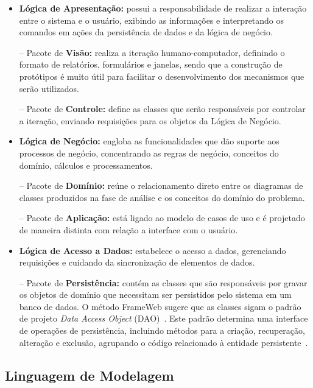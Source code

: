 \begin{itemize}

	\item \textbf{Lógica de Apresentação:} possui a responsabilidade de realizar a interação entre o sistema e o usuário, exibindo as informações e interpretando os comandos em ações da persistência de dados e da lógica de negócio.
		
		\subitem -- Pacote de \textbf{Visão:} realiza a iteração humano-computador, definindo o formato de relatórios, formulários e janelas, sendo que a construção de protótipos é muito útil para facilitar o desenvolvimento dos mecanismos que serão utilizados. 
		
		\subitem -- Pacote de \textbf{Controle:} define as classes que serão responsáveis por controlar a iteração, enviando requisições para os objetos da Lógica de Negócio.  
	
	\item \textbf{Lógica de Negócio:} engloba as funcionalidades que dão suporte aos processos de negócio, concentrando as regras de negócio, conceitos do domínio, cálculos e processamentos.
	
		\subitem -- Pacote de \textbf{Domínio:} reúne o relacionamento direto entre os diagramas de classes produzidos na fase de análise e os conceitos do domínio do problema. 
		
		\subitem -- Pacote de \textbf{Aplicação:} está ligado ao modelo de casos de uso e é projetado de maneira distinta com relação a interface com o usuário.
	
	\item \textbf{Lógica de Acesso a Dados:} estabelece o acesso a dados, gerenciando requisições e cuidando da sincronização de elementos de dados.
	
		\subitem -- Pacote de \textbf{Persistência:} contém as classes que são responsáveis por gravar os objetos de domínio que necessitam ser persistidos pelo sistema em um banco de dados. O método FrameWeb sugere que as classes sigam o padrão de projeto \textit{Data Access Object} (DAO)~\cite{alur-et-al:bpds03}. Este padrão determina uma interface de operações de persistência, incluindo métodos para a criação, recuperação, alteração e exclusão, agrupando o código relacionado à entidade persistente~\cite{bauer-et-al:jpwh07}. 

\end{itemize}

\subsection{Linguagem de Modelagem}
\label{sec-ref-linguagem-modelagem}

